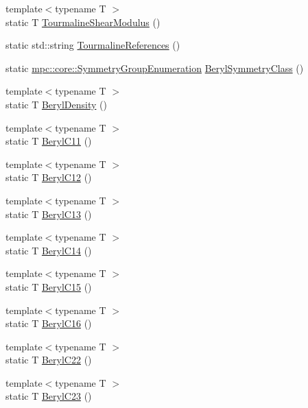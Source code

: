 \begin{DoxyCompactItemize}
\item 
{\footnotesize template$<$typename T $>$ }\\static T \mbox{\hyperlink{namespacempc_1_1data_a86dfd4f027c4d52aa385c770751c5e1e}{Tourmaline\+Shear\+Modulus}} ()
\item 
static std\+::string \mbox{\hyperlink{namespacempc_1_1data_afe4d9a1f1fc9e0dd0ad7a31e97b2858a}{Tourmaline\+References}} ()
\item 
static \mbox{\hyperlink{namespacempc_1_1core_a9d979684062547055a0ef5c13077bad8}{mpc\+::core\+::\+Symmetry\+Group\+Enumeration}} \mbox{\hyperlink{namespacempc_1_1data_ac282c4fe86ec7c650ff396bbf915af6d}{Beryl\+Symmetry\+Class}} ()
\item 
{\footnotesize template$<$typename T $>$ }\\static T \mbox{\hyperlink{namespacempc_1_1data_abce68d7af2caef318a1469ebeefd90f2}{Beryl\+Density}} ()
\item 
{\footnotesize template$<$typename T $>$ }\\static T \mbox{\hyperlink{namespacempc_1_1data_afb44b86d6020019ac8e4edbee19f5829}{Beryl\+C11}} ()
\item 
{\footnotesize template$<$typename T $>$ }\\static T \mbox{\hyperlink{namespacempc_1_1data_a5252822737b5c18f3e4747c30a30cc2e}{Beryl\+C12}} ()
\item 
{\footnotesize template$<$typename T $>$ }\\static T \mbox{\hyperlink{namespacempc_1_1data_ae1450834806a9b5518b5a389429f78f9}{Beryl\+C13}} ()
\item 
{\footnotesize template$<$typename T $>$ }\\static T \mbox{\hyperlink{namespacempc_1_1data_a80b470aa4edb25d55e84e9e8f6f412d3}{Beryl\+C14}} ()
\item 
{\footnotesize template$<$typename T $>$ }\\static T \mbox{\hyperlink{namespacempc_1_1data_a0e42d1d986c1c45e116e8062c86a023e}{Beryl\+C15}} ()
\item 
{\footnotesize template$<$typename T $>$ }\\static T \mbox{\hyperlink{namespacempc_1_1data_a40354502fc40c775649cbae5a16a9f23}{Beryl\+C16}} ()
\item 
{\footnotesize template$<$typename T $>$ }\\static T \mbox{\hyperlink{namespacempc_1_1data_aa81021345354ad32ddc0503d12d13d7f}{Beryl\+C22}} ()
\item 
{\footnotesize template$<$typename T $>$ }\\static T \mbox{\hyperlink{namespacempc_1_1data_aaea99063c6b69744b1330d8796095bca}{Beryl\+C23}} ()

\end{DoxyCompactItemize}
